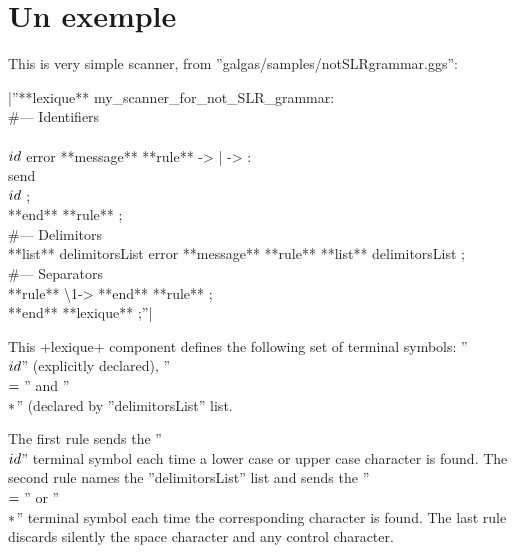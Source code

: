 \section{Un exemple}

This is very simple scanner, from ''galgas/samples/notSLRgrammar.ggs'':

|''**lexique** my\_scanner\_for\_not\_SLR\_grammar:\\
\#--- Identifiers\\
\\$id\\$ error **message** %
**rule** \textquotesingle -> \textquotesingle | \textquotesingle -> \textquotesingle :\\
 send \\$id\\$ ;\\ **end** **rule** ;\\
\#--- Delimitors\\
**list** delimitorsList error **message** %
**rule** **list** delimitorsList ;\\
\#--- Separators\\
**rule** \textquotesingle\textbackslash{1}\textquotesingle -> %
**end** **rule** ;\\
**end** **lexique** ;''|

This \ggst+lexique+ component defines the following set of terminal symbols: ''\\$id\\$'' (explicitly declared), ''\\$=\\$'' and ''\\$*\\$'' (declared  by ''delimitorsList'' list.

The first rule sends the ''\\$id\\$'' terminal symbol each time a lower case or upper case character is found. The second rule names the ''delimitorsList'' list and sends the ''\\$=\\$'' or ''\\$*\\$'' terminal symbol each time the corresponding character is found. The last rule discards silently the space character and any control character.

